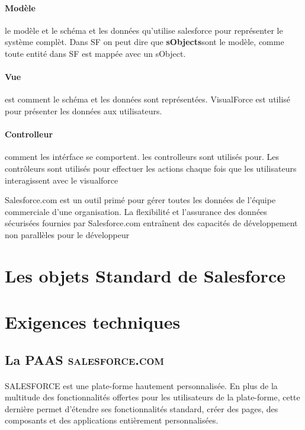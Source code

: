 \documentclass[a4paper, 12pt]{report}
\begin{document}
\begin{itemize}
\paragraph{Modèle}
le modèle et le schéma et les données qu'utilise salesforce pour représenter le système complèt. Dans SF on peut dire que \textbf{sObjects}sont le modèle, comme toute entité dans SF est mappée avec un sObject.
\paragraph{Vue}
est comment le schéma et les données sont représentées. VisualForce est utilisé pour présenter les données aux utilisateurs.
\paragraph{Controlleur}
comment les intérface se comportent. les controlleurs sont utilisés pour. Les contrôleurs sont utilisés pour effectuer les actions chaque fois que les utilisateurs interagissent avec le visualforce

Salesforce.com est un outil primé pour gérer toutes les données de l'équipe commerciale d'une organisation. La flexibilité et l'assurance des données sécurisées fournies par Salesforce.com entraînent des capacités de développement non parallèles pour le développeur
 
\section {Les objets Standard de Salesforce}

\section{Exigences techniques}

\subsection{La PAAS \textsc{salesforce.com}}
\paragraph{}
SALESFORCE est une plate-forme hautement personnalisée. En plus de la multitude des fonctionnalités offertes pour les utilisateurs de la plate-forme, cette dernière permet d'étendre ses fonctionnalités standard, créer des pages, des composants et des applications entièrement personnalisées.

\end{itemize}
\end{document}

